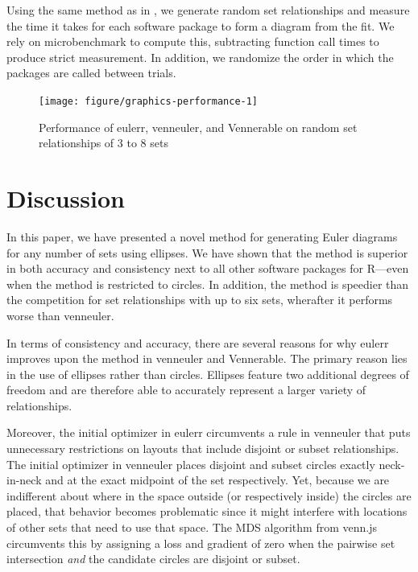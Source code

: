 \documentclass[
  oneside,
  usegeometry,
  numbers=noendperiod,
  openany,
  parskip=half
]{scrbook}\usepackage[]{graphicx}\usepackage{xcolor}
\newenvironment{knitrout}{}{} %
\newcommand{\pkg}[1]{{\fontseries{b}\selectfont #1}}
\begin{document}
Using the same method as in , we generate random set relationships and measure the time it takes for each software package to form a diagram from the fit. We rely on \pkg{microbenchmark} to compute this, subtracting function call times to produce strict measurement. In addition, we randomize the order in which the packages are called between trials.

\begin{figure}[hbt]
\begin{knitrout}
\color{fgcolor}

{\centering \texttt{[image: figure/graphics-performance-1]} 

}



\end{knitrout}
\caption{Performance of \pkg{eulerr}, \pkg{venneuler}, and \pkg{Vennerable} on random set relationships of 3 to 8 sets }
\label{fig:performance}
\end{figure}

\chapter{Discussion}
\label{sec:discussion}

In this paper, we have presented a novel method for generating Euler diagrams for any number of sets using ellipses. We have shown that the method is superior in both accuracy and consistency next to all other software packages for R---even when the method is restricted to circles. In addition, the method is speedier than the competition for set relationships with up to six sets, wherafter it performs worse than \pkg{venneuler}.

In terms of consistency and accuracy, there are several reasons for why \pkg{eulerr} improves upon the method in \pkg{venneuler} and \pkg{Vennerable}. The primary reason lies in the use of ellipses rather than circles. Ellipses feature two additional degrees of freedom and are therefore able to accurately represent a larger variety of relationships.

Moreover, the initial optimizer in \pkg{eulerr} circumvents a rule in \pkg{venneuler} that puts unnecessary restrictions on layouts that include disjoint or subset relationships. The initial optimizer in venneuler places disjoint and subset circles exactly neck-in-neck and at the exact midpoint of the set respectively. Yet, because we are indifferent about where in the space outside (or respectively inside) the circles are placed, that behavior becomes problematic since it might interfere with locations of other sets that need to use that space. The MDS algorithm from \pkg{venn.js} circumvents this by assigning a loss and gradient of zero when the pairwise set intersection \emph{and} the candidate circles are disjoint or subset.
\end{document}
